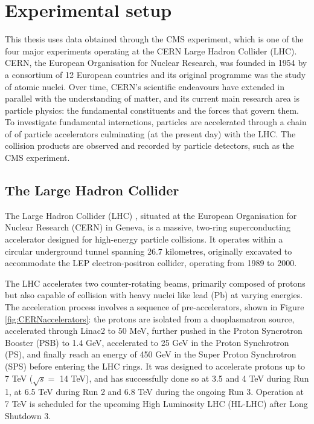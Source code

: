 \chapter{Experimental setup}
This thesis uses data obtained through the CMS experiment, which is one of the four major experiments operating at the CERN Large Hadron Collider (LHC).
CERN, the European Organisation for Nuclear Research, was founded in 1954 by a consortium of 12 European countries and its original programme was the study of atomic nuclei.
Over time, CERN's scientific endeavours have extended in parallel with the understanding of matter, and its current main research area is particle physics: the fundamental constituents and the forces that govern them.
To investigate fundamental interactions, particles are accelerated through a chain of of particle accelerators culminating (at the present day) with the LHC.
The collision products are observed and recorded by particle detectors, such as the CMS experiment.

\section{The Large Hadron Collider}
The Large Hadron Collider (LHC) \cite{CERN-AC-93-03-LHC}, situated at the European Organisation for Nuclear Research (CERN) in Geneva, is a massive, two-ring superconducting accelerator designed for high-energy particle collisions.
It operates within a circular underground tunnel spanning 26.7 kilometres, originally excavated to accommodate the LEP electron-positron collider, operating from 1989 to 2000.

The LHC accelerates two counter-rotating beams, primarily composed of protons but also capable of collision with heavy nuclei like lead (Pb) at varying energies.
The acceleration process involves a sequence of pre-accelerators, shown in Figure \ref{fig:CERNaccelerators}: the protons are isolated from a duoplasmatron source, accelerated through Linac2 to 50 MeV, further pushed in the Proton Syncrotron Booster (PSB) to 1.4 GeV, accelerated to 25 GeV in the Proton Synchrotron (PS), and finally reach an energy of 450 GeV in the Super Proton Synchrotron (SPS) before entering the LHC rings.
It was designed to accelerate protons up to 7 TeV ($\sqrt{s} =$ 14 TeV), and has successfully done so at 3.5 and 4 TeV during Run 1, at 6.5 TeV during Run 2 and 6.8 TeV during the ongoing Run 3.
Operation at 7 TeV is scheduled for the upcoming High Luminosity LHC (HL-LHC) after Long Shutdown 3.

